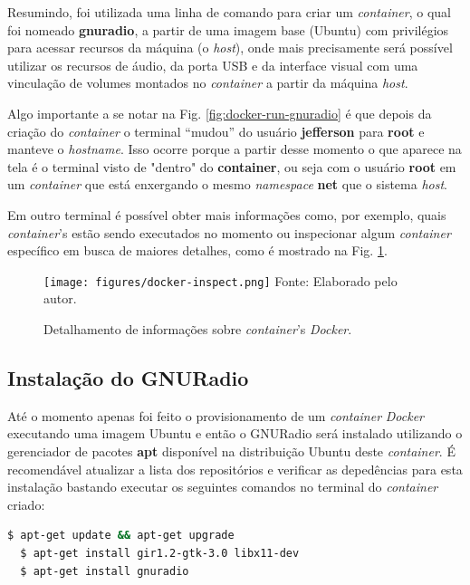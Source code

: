 \documentclass[
  12pt,				%
  openright,			%
  twoside,			%
  a4paper,			%
  english,			%
  french,				%
  spanish,			%
  brazil,				%
  ]{abntex2}
\begin{document}
Resumindo, foi utilizada uma linha de comando para criar um \textit{container}, o qual foi nomeado \textbf{gnuradio}, a partir de uma imagem base (Ubuntu) com
privilégios para acessar recursos da máquina (o \textit{host}), onde mais precisamente será possível utilizar os recursos de áudio, da porta USB e da
interface visual com uma vinculação de volumes montados no \textit{container} a partir da máquina \textit{host}.

Algo importante a se notar na Fig. \ref{fig:docker-run-gnuradio} é que depois da criação do \textit{container} o terminal “mudou” do usuário \textbf{jefferson} para \textbf{root}
e manteve o \textit{hostname}. Isso ocorre porque a partir desse momento o que aparece na tela é o terminal visto de "dentro"
do \textbf{container}, ou seja com o usuário \textbf{root} em um \textit{container} que está enxergando o mesmo \textit{namespace} \textbf{net} que o
sistema \textit{host}.

Em outro terminal é possível obter mais informações como, por exemplo, quais \textit{container}'s estão sendo executados no momento ou inspecionar algum
\textit{container} específico em busca de maiores detalhes, como é mostrado na Fig. \ref{fig:docker-inspect}.

\begin{figure}[!htb]
  \centering
  \caption{Detalhamento de informações sobre \textit{container}’s \textit{Docker}.}
  \texttt{[image: figures/docker-inspect.png]}
  Fonte: Elaborado pelo autor.
  \label{fig:docker-inspect}
\end{figure}

\newpage
\subsection*{Instalação do GNURadio}

Até o momento apenas foi feito o provisionamento de um \textit{container} \textit{Docker} executando uma imagem Ubuntu e então o GNURadio será instalado utilizando
o gerenciador de pacotes \textbf{apt} disponível na distribuição Ubuntu deste \textit{container}. É recomendável atualizar a lista dos repositórios e verificar
as depedências para esta instalação bastando executar os seguintes comandos no terminal do \textit{container} criado:

\begin{adjustbox}{max width=\linewidth}
  \begin{lstlisting}[language=bash]
  $ apt-get update && apt-get upgrade
  $ apt-get install gir1.2-gtk-3.0 libx11-dev
  $ apt-get install gnuradio
\end{lstlisting}
\end{adjustbox}
\end{document}
